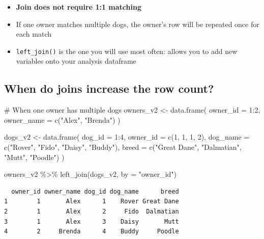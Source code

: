 \documentclass[
  letterpaper,
  DIV=11,
  numbers=noendperiod]{scrartcl}
\newenvironment{Shaded}{\begin{snugshade}}{\end{snugshade}}
\newcommand{\AttributeTok}[1]{\textcolor[rgb]{0.40,0.45,0.13}{#1}}
\newcommand{\CommentTok}[1]{\textcolor[rgb]{0.37,0.37,0.37}{#1}}
\newcommand{\DecValTok}[1]{\textcolor[rgb]{0.68,0.00,0.00}{#1}}
\newcommand{\FunctionTok}[1]{\textcolor[rgb]{0.28,0.35,0.67}{#1}}
\newcommand{\NormalTok}[1]{\textcolor[rgb]{0.00,0.23,0.31}{#1}}
\newcommand{\OtherTok}[1]{\textcolor[rgb]{0.00,0.23,0.31}{#1}}
\newcommand{\SpecialCharTok}[1]{\textcolor[rgb]{0.37,0.37,0.37}{#1}}
\newcommand{\StringTok}[1]{\textcolor[rgb]{0.13,0.47,0.30}{#1}}
\providecommand{\tightlist}{%
  \setlength{\itemsep}{0pt}\setlength{\parskip}{0pt}}
\begin{document}
\begin{itemize}
\tightlist
\item
  \textbf{Join does not require 1:1 matching}
\item
  If one owner matches multiple dogs, the owner's row will be repeated
  once for each match
\item
  \texttt{left\_join()} is the one you will use most often: allows you
  to add new variables onto your analysis dataframe
\end{itemize}

\subsection{When do joins increase the row
count?}\label{when-do-joins-increase-the-row-count}

\begin{Shaded}
\begin{Highlighting}[]
\CommentTok{\# When one owner has multiple dogs}
\NormalTok{owners\_v2 }\OtherTok{\textless{}{-}} \FunctionTok{data.frame}\NormalTok{(}
  \AttributeTok{owner\_id =} \DecValTok{1}\SpecialCharTok{:}\DecValTok{2}\NormalTok{,}
  \AttributeTok{owner\_name =} \FunctionTok{c}\NormalTok{(}\StringTok{"Alex"}\NormalTok{, }\StringTok{"Brenda"}\NormalTok{)}
\NormalTok{)}

\NormalTok{dogs\_v2 }\OtherTok{\textless{}{-}} \FunctionTok{data.frame}\NormalTok{(}
  \AttributeTok{dog\_id =} \DecValTok{1}\SpecialCharTok{:}\DecValTok{4}\NormalTok{,}
  \AttributeTok{owner\_id =} \FunctionTok{c}\NormalTok{(}\DecValTok{1}\NormalTok{, }\DecValTok{1}\NormalTok{, }\DecValTok{1}\NormalTok{, }\DecValTok{2}\NormalTok{),}
  \AttributeTok{dog\_name =} \FunctionTok{c}\NormalTok{(}\StringTok{"Rover"}\NormalTok{, }\StringTok{"Fido"}\NormalTok{, }\StringTok{"Daisy"}\NormalTok{, }\StringTok{"Buddy"}\NormalTok{),}
  \AttributeTok{breed =} \FunctionTok{c}\NormalTok{(}\StringTok{"Great Dane"}\NormalTok{, }\StringTok{"Dalmatian"}\NormalTok{, }\StringTok{"Mutt"}\NormalTok{, }\StringTok{"Poodle"}\NormalTok{)}
\NormalTok{)}

\NormalTok{owners\_v2 }\SpecialCharTok{\%\textgreater{}\%} \FunctionTok{left\_join}\NormalTok{(dogs\_v2, }\AttributeTok{by =} \StringTok{"owner\_id"}\NormalTok{)}
\end{Highlighting}
\end{Shaded}

\begin{verbatim}
  owner_id owner_name dog_id dog_name      breed
1        1       Alex      1    Rover Great Dane
2        1       Alex      2     Fido  Dalmatian
3        1       Alex      3    Daisy       Mutt
4        2     Brenda      4    Buddy     Poodle
\end{verbatim}
\end{document}
